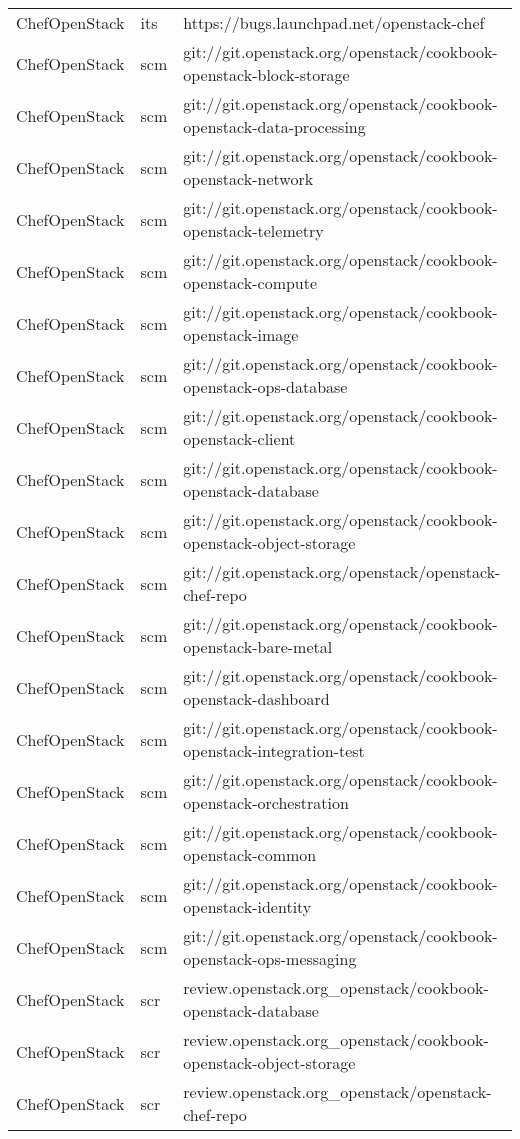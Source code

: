 \begin{center}
\begin{longtable}{|p{4cm}|p{1cm}|p{10cm}|}
ChefOpenStack&its&https://bugs.launchpad.net/openstack-chef\\ 
ChefOpenStack&scm&git://git.openstack.org/openstack/cookbook-openstack-block-storage\\ 
ChefOpenStack&scm&git://git.openstack.org/openstack/cookbook-openstack-data-processing\\ 
ChefOpenStack&scm&git://git.openstack.org/openstack/cookbook-openstack-network\\ 
ChefOpenStack&scm&git://git.openstack.org/openstack/cookbook-openstack-telemetry\\ 
ChefOpenStack&scm&git://git.openstack.org/openstack/cookbook-openstack-compute\\ 
ChefOpenStack&scm&git://git.openstack.org/openstack/cookbook-openstack-image\\ 
ChefOpenStack&scm&git://git.openstack.org/openstack/cookbook-openstack-ops-database\\ 
ChefOpenStack&scm&git://git.openstack.org/openstack/cookbook-openstack-client\\ 
ChefOpenStack&scm&git://git.openstack.org/openstack/cookbook-openstack-database\\ 
ChefOpenStack&scm&git://git.openstack.org/openstack/cookbook-openstack-object-storage\\ 
ChefOpenStack&scm&git://git.openstack.org/openstack/openstack-chef-repo\\ 
ChefOpenStack&scm&git://git.openstack.org/openstack/cookbook-openstack-bare-metal\\ 
ChefOpenStack&scm&git://git.openstack.org/openstack/cookbook-openstack-dashboard\\ 
ChefOpenStack&scm&git://git.openstack.org/openstack/cookbook-openstack-integration-test\\ 
ChefOpenStack&scm&git://git.openstack.org/openstack/cookbook-openstack-orchestration\\ 
ChefOpenStack&scm&git://git.openstack.org/openstack/cookbook-openstack-common\\ 
ChefOpenStack&scm&git://git.openstack.org/openstack/cookbook-openstack-identity\\ 
ChefOpenStack&scm&git://git.openstack.org/openstack/cookbook-openstack-ops-messaging\\ 
ChefOpenStack&scr&review.openstack.org\_openstack/cookbook-openstack-database\\ 
ChefOpenStack&scr&review.openstack.org\_openstack/cookbook-openstack-object-storage\\ 
ChefOpenStack&scr&review.openstack.org\_openstack/openstack-chef-repo\\ 

\end{longtable}
\end{center}
